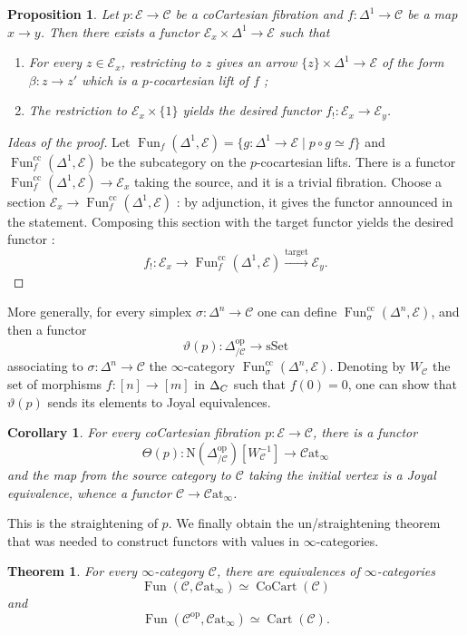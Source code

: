 \documentclass[11pt]{article}
\newtheorem{theorem}{Theorem}
\newtheorem{proposition}{Proposition}
\newtheorem{corollary}{Corollary}
\theoremstyle{definition}
\newcommand{\C}{\mathcal{C}}
\newcommand{\Catinf}{\mathcal{C}\mathrm{at}_{\infty}}
\newcommand{\cc}{\mathrm{cc}}
\newcommand{\E}{\mathcal{E}}
\newcommand{\Fun}{\operatorname{Fun}}
\newcommand{\N}{\mathrm{N}}
\newcommand{\op}{\mathrm{op}}
\newcommand{\sSet}{\mathrm{sSet}}
\begin{document}
\begin{proposition}
    Let $p : \E \to \C$ be a coCartesian fibration and $f : \Delta^1 \to \C$ be a map $x \to y$.
    Then there exists a functor $\E_x \times \Delta^1 \to \E$ such that
    \begin{enumerate}
        \item For every $z \in \E_x$, restricting to $z$ gives an arrow $\{z\} \times \Delta^1 \to \E$ of the form $\beta : z \to z'$ which is a $p$-cocartesian lift of $f$ ;
        \item The restriction to $\E_x \times \{1\}$ yields the desired functor $f_! : \E_x \to \E_y$.
    \end{enumerate}
\end{proposition}
\begin{proof}[Ideas of the proof]
    Let $\Fun_f(\Delta^1, \E) = \{g : \Delta^1 \to \E \mid p \circ g \simeq f\}$ and $\Fun_f^{\cc}(\Delta^1, \E)$ be the subcategory on the $p$-cocartesian lifts.
    There is a functor $\Fun_f^{\cc}(\Delta^1, \E) \to \E_x$ taking the source, and it is a trivial fibration.
    Choose a section $\E_x \to \Fun_f^{\cc}(\Delta^1, \E)$ : by adjunction, it gives the functor announced in the statement.
    Composing this section with the target functor yields the desired functor :
    \[
        f_! : \E_x \to \Fun_f^{\cc}(\Delta^1, \E) \xrightarrow{\text{target}} \E_y.
    \]
\end{proof}

More generally, for every simplex $\sigma : \Delta^n \to \C$ one can define $\Fun_{\sigma}^{\cc}(\Delta^n, \E)$, and then a functor
\[
    \vartheta(p) : \Delta^{\op}_{/\C} \to \sSet
\]
associating to $\sigma : \Delta^n \to \C$ the $\infty$-category $\Fun_{\sigma}^{\cc}(\Delta^n, \E)$.
Denoting by $W_{\C}$ the set of morphisms $f : [n] \to [m]$ in $\Delta_{\/C}$ such that $f(0) = 0$, one can show that $\vartheta(p)$ sends its elements to Joyal equivalences.

\begin{corollary}
    For every coCartesian fibration $p : \E \to \C$, there is a functor
    \[
        \Theta(p) : \N(\Delta^{\op}_{/\C})[W_{\C}^{-1}] \to \Catinf
    \]
    and the map from the source category to $\C$ taking the initial vertex is a Joyal equivalence, whence a functor $\C \to \Catinf$.
\end{corollary}
This is the straightening of $p$.
We finally obtain the un/straightening theorem that was needed to construct functors with values in $\infty$-categories.
\begin{theorem}
    For every $\infty$-category $\C$, there are equivalences of $\infty$-categories
    \[
        \Fun(\C, \Catinf) \simeq \operatorname{CoCart}(\C)
    \]
    and
    \[
        \Fun(\C^{\op}, \Catinf) \simeq \operatorname{Cart}(\C).
    \]
\end{theorem}
\end{document}
